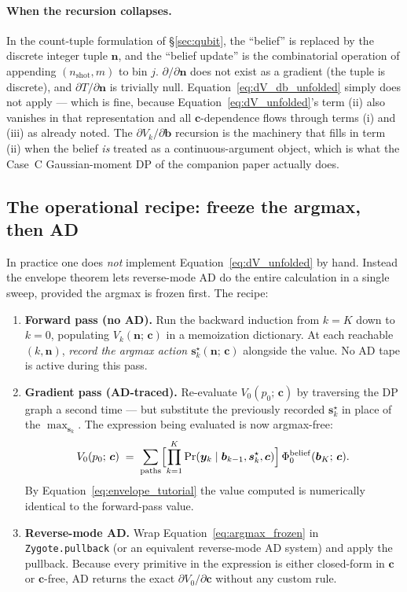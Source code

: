 \documentclass[11pt]{article}
\newcommand{\bc}{\bm{c}}
\newcommand{\by}{\bm{y}}
\newcommand{\bs}{\bm{s}}
\newcommand{\bb}{\bm{b}}
\begin{document}
\paragraph{When the recursion collapses.}  In the count-tuple formulation of §\ref{sec:qubit}, the ``belief'' is replaced by the discrete integer tuple $\mathbf{n}$, and the ``belief update'' is the combinatorial operation of appending $(n_\text{shot}, m)$ to bin $j$.  $\partial / \partial \mathbf{n}$ does not exist as a gradient (the tuple is discrete), and $\partial T / \partial \mathbf{n}$ is trivially null.  Equation~\eqref{eq:dV_db_unfolded} simply does not apply --- which is fine, because Equation~\eqref{eq:dV_unfolded}'s term (ii) also vanishes in that representation and all $\bc$-dependence flows through terms (i) and (iii) as already noted.  The $\partial V_k / \partial \bb$ recursion is the machinery that fills in term (ii) when the belief \emph{is} treated as a continuous-argument object, which is what the Case~C Gaussian-moment DP of the companion paper actually does.

\subsection{The operational recipe: freeze the argmax, then AD}

In practice one does \emph{not} implement Equation~\eqref{eq:dV_unfolded} by hand.  Instead the envelope theorem lets reverse-mode AD do the entire calculation in a single sweep, provided the argmax is frozen first.  The recipe:

\begin{enumerate}[nosep, leftmargin=*]
\item \textbf{Forward pass (no AD).}  Run the backward induction from $k = K$ down to $k = 0$, populating $V_k(\mathbf{n};\, \bc)$ in a memoization dictionary.  At each reachable $(k, \mathbf{n})$, \emph{record the argmax action $\bs_k^\star(\mathbf{n};\, \bc)$} alongside the value.  No AD tape is active during this pass.
\item \textbf{Gradient pass (AD-traced).}  Re-evaluate $V_0(p_0;\, \bc)$ by traversing the DP graph a second time --- but substitute the previously recorded $\bs_k^\star$ in place of the $\max_{\bs_k}$.  The expression being evaluated is now argmax-free:
\begin{equation}
V_0(p_0;\, \bc) \;=\; \sum_{\text{paths}} \Bigl[\prod_{k=1}^K \Pr(\by_k \mid \bb_{k-1}, \bs_k^\star, \bc)\Bigr]\, \Phi_0^{\mathrm{belief}}(\bb_K;\, \bc).
\label{eq:argmax_frozen}
\end{equation}
By Equation~\eqref{eq:envelope_tutorial} the value computed is numerically identical to the forward-pass value.
\item \textbf{Reverse-mode AD.}  Wrap Equation~\eqref{eq:argmax_frozen} in \texttt{Zygote.pullback} (or an equivalent reverse-mode AD system) and apply the pullback.  Because every primitive in the expression is either closed-form in $\bc$ or $\bc$-free, AD returns the exact $\partial V_0 / \partial \bc$ without any custom rule.
\end{enumerate}
\end{document}
